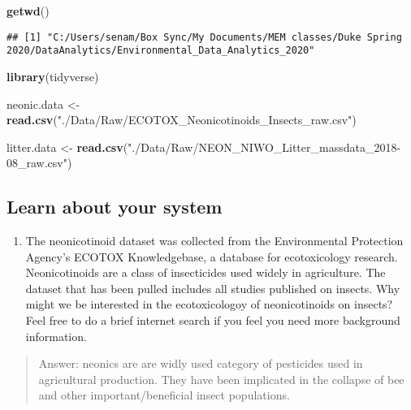 \documentclass[
]{article}
\newenvironment{Shaded}{\begin{snugshade}}{\end{snugshade}}
\newcommand{\KeywordTok}[1]{\textcolor[rgb]{0.13,0.29,0.53}{\textbf{#1}}}
\newcommand{\NormalTok}[1]{#1}
\newcommand{\StringTok}[1]{\textcolor[rgb]{0.31,0.60,0.02}{#1}}
\providecommand{\tightlist}{%
  \setlength{\itemsep}{0pt}\setlength{\parskip}{0pt}}
\begin{document}
\begin{Shaded}
\begin{Highlighting}[]
\KeywordTok{getwd}\NormalTok{()}
\end{Highlighting}
\end{Shaded}

\begin{verbatim}
## [1] "C:/Users/senam/Box Sync/My Documents/MEM classes/Duke Spring 2020/DataAnalytics/Environmental_Data_Analytics_2020"
\end{verbatim}

\begin{Shaded}
\begin{Highlighting}[]
\KeywordTok{library}\NormalTok{(tidyverse)}

\NormalTok{neonic.data <-}\StringTok{ }\KeywordTok{read.csv}\NormalTok{(}\StringTok{"./Data/Raw/ECOTOX_Neonicotinoids_Insects_raw.csv"}\NormalTok{)}

\NormalTok{litter.data <-}\StringTok{ }\KeywordTok{read.csv}\NormalTok{(}\StringTok{"./Data/Raw/NEON_NIWO_Litter_massdata_2018-08_raw.csv"}\NormalTok{)}
\end{Highlighting}
\end{Shaded}

\hypertarget{learn-about-your-system}{%
\subsection{Learn about your system}\label{learn-about-your-system}}

\begin{enumerate}
\def\labelenumi{\arabic{enumi}.}
\setcounter{enumi}{1}
\tightlist
\item
  The neonicotinoid dataset was collected from the Environmental
  Protection Agency's ECOTOX Knowledgebase, a database for ecotoxicology
  research. Neonicotinoids are a class of insecticides used widely in
  agriculture. The dataset that has been pulled includes all studies
  published on insects. Why might we be interested in the ecotoxicologoy
  of neonicotinoids on insects? Feel free to do a brief internet search
  if you feel you need more background information.
\end{enumerate}

\begin{quote}
Answer: neonics are are widly used category of pesticides used in
agricultural production. They have been implicated in the collapse of
bee and other important/beneficial insect populations.
\end{quote}
\end{document}
